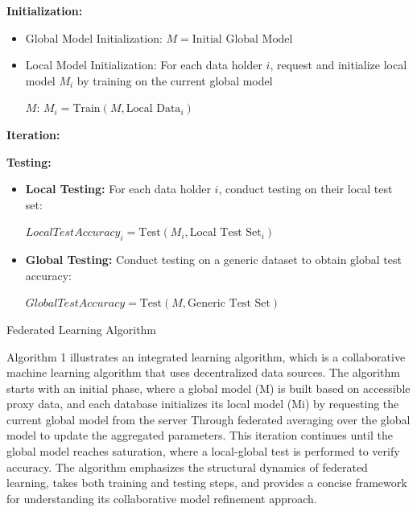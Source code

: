 \documentclass[conference]{IEEEtran}
\begin{document}
\begin{algorithm}[H]
\begin{scriptsize}  
    
    \textbf{Initialization:}
    \begin{itemize}
        \item Global Model Initialization: $M = \text{Initial Global Model}$
        \item Local Model Initialization: For each data holder $i$, request and initialize local model $M_i$ by training on the current global model 
        
        $M$: $M_i = \text{Train}(M, \text{Local Data}_i)$
    \end{itemize}
    
    \textbf{Iteration:}
    
    \textbf{Testing:}
    \begin{itemize}
        \item \textbf{Local Testing:} For each data holder $i$, conduct testing on their local test set:

        $Local Test Accuracy_i = \text{Test}(M_i, \text{Local Test Set}_i)$
        \item \textbf{Global Testing:} Conduct testing on a generic dataset to obtain global test accuracy: 
        
        $Global Test Accuracy = \text{Test}(M, \text{Generic Test Set})$
    \end{itemize}
    
    \caption{Federated Learning Algorithm}
\end{scriptsize}
    
\end{algorithm}

Algorithm 1 illustrates an integrated learning algorithm, which is a collaborative machine learning algorithm that uses decentralized data sources. The algorithm starts with an initial phase, where a global model (M) is built based on accessible proxy data, and each database initializes its local model (Mi) by requesting the current global model from the server Through federated averaging over the global model to update the aggregated parameters. This iteration continues until the global model reaches saturation, where a local-global test is performed to verify accuracy. The algorithm emphasizes the structural dynamics of federated learning, takes both training and testing steps, and provides a concise framework for understanding its collaborative model refinement approach.
\end{document}
